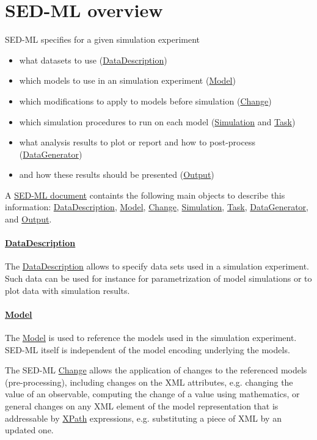 \section{SED-ML overview}
SED-ML specifies for a given simulation experiment

\begin{itemize}
\item what datasets to use (\hyperref[class:dataDescription]{DataDescription})
\item which models to use in an simulation experiment (\hyperref[class:model]{Model})
\item which modifications to apply to models before simulation (\hyperref[class:change]{Change}) 
\item which simulation procedures to run on each model (\hyperref[class:simulation]{Simulation} and \hyperref[class:task]{Task})
\item what analysis results to plot or report and how to post-process (\hyperref[class:dataGenerator]{DataGenerator})
\item and how these results should be presented (\hyperref[class:output]{Output})
\end{itemize}

A \hyperref[class:sed-ml]{SED-ML document} containts the following main objects to describe this information: \hyperref[class:dataDescription]{DataDescription}, \hyperref[class:model]{Model}, \hyperref[class:change]{Change}, \hyperref[class:simulation]{Simulation}, \hyperref[class:task]{Task}, \hyperref[class:dataGenerator]{DataGenerator}, and \hyperref[class:output]{Output}.

\paragraph*{\hyperref[class:dataDescription]{DataDescription}}
The \hyperref[class:dataDescription]{DataDescription} allows to specify data sets used in a simulation experiment. Such data can be used for instance for parametrization of model simulations or to plot data with simulation results.

\paragraph*{\hyperref[class:model]{Model}}
The \hyperref[class:model]{Model} is used to reference the models used in the simulation experiment. SED-ML itself is independent of the model encoding underlying the models.

The SED-ML \hyperref[class:change]{Change} allows the application of changes to the referenced models (pre-processing), including changes on the XML attributes, e.g. changing the value of an observable, computing the change of a value using mathematics, or general changes on any XML element of the model representation that is addressable by \hyperref[sec:xpath]{XPath} expressions, e.g. substituting a piece of XML by an updated one.

